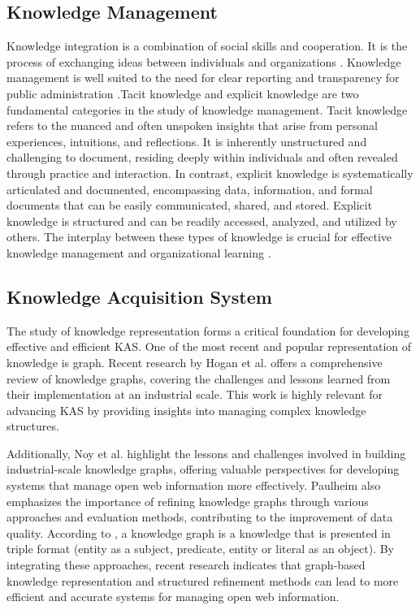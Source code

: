 \documentclass[runningheads]{llncs}
\begin{document}
\subsection{Knowledge Management}
Knowledge integration is a combination of social skills and cooperation. It is the process of exchanging ideas between individuals and organizations \cite{Gao2021}. Knowledge management is well suited to the need for clear reporting and transparency for public administration \cite{Bem2022}.Tacit knowledge and explicit knowledge are two fundamental categories in the study of knowledge management. Tacit knowledge refers to the nuanced and often unspoken insights that arise from personal experiences, intuitions, and reflections. It is inherently unstructured and challenging to document, residing deeply within individuals and often revealed through practice and interaction. In contrast, explicit knowledge is systematically articulated and documented, encompassing data, information, and formal documents that can be easily communicated, shared, and stored. Explicit knowledge is structured and can be readily accessed, analyzed, and utilized by others. The interplay between these types of knowledge is crucial for effective knowledge management and organizational learning \cite{vincent2022}. 

\subsection{Knowledge Acquisition System}
The study of knowledge representation forms a critical foundation for developing effective and efficient KAS. One of the most recent and popular representation of knowledge is graph. Recent research by Hogan et al. \cite{Hogan2021} offers a comprehensive review of knowledge graphs, covering the challenges and lessons learned from their implementation at an industrial scale. This work is highly relevant for advancing KAS by providing insights into managing complex knowledge structures. 

Additionally, Noy et al. \cite{Noy2019} highlight the lessons and challenges involved in building industrial-scale knowledge graphs, offering valuable perspectives for developing systems that manage open web information more effectively. Paulheim \cite{Paulheim2017} also emphasizes the importance of refining knowledge graphs through various approaches and evaluation methods, contributing to the improvement of data quality. According to \cite{wiharja2020iterative}, a knowledge graph is a knowledge that is presented in triple format (entity as a subject, predicate, entity or literal as an object). By integrating these approaches, recent research indicates that graph-based knowledge representation and structured refinement methods can lead to more efficient and accurate systems for managing open web information.
\end{document}
